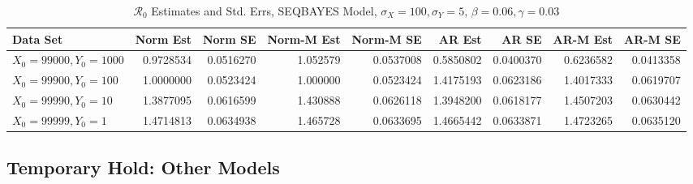 \documentclass[12pt]{article}
\newcommand{\rr}{\ensuremath{\mathcal{R}_0}}
\begin{document}
\begin{table}[H]
	
	\caption{\label{tab:}$\rr$ Estimates and Std. Errs, SEQBAYES Model,
		$\sigma_X = 100, \sigma_Y = 5$, $\beta = 0.06, \gamma = 0.03$}
	\centering
	\begin{footnotesize}
	\begin{tabular}[t]{l|r|r|r|r|r|r|r|r}
		\hline
		Data Set & Norm Est & Norm SE & Norm-M Est & Norm-M SE & AR Est & AR SE & AR-M Est & AR-M SE\\
		\hline
		$X_0 = 99000, Y_0 = 1000$ & 0.9728534 & 0.0516270 & 1.052579 & 0.0537008 & 0.5850802 & 0.0400370 & 0.6236582 & 0.0413358\\
		\hline
		$X_0 = 99900, Y_0 = 100$ & 1.0000000 & 0.0523424 & 1.000000 & 0.0523424 & 1.4175193 & 0.0623186 & 1.4017333 & 0.0619707\\
		\hline
		$X_0 = 99990, Y_0 = 10$ & 1.3877095 & 0.0616599 & 1.430888 & 0.0626118 & 1.3948200 & 0.0618177 & 1.4507203 & 0.0630442\\
		\hline
		$X_0 = 99999, Y_0 = 1$ & 1.4714813 & 0.0634938 & 1.465728 & 0.0633695 & 1.4665442 & 0.0633871 & 1.4723265 & 0.0635120\\
		\hline
	\end{tabular}
\end{footnotesize}
\end{table}

\subsection{Temporary Hold: Other Models}
\end{document}
